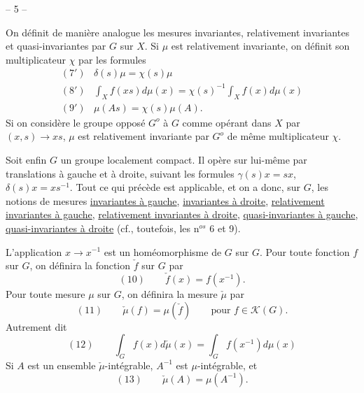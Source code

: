 \begin{center}-- 5 --\end{center}
On définit de manière analogue les mesures invariantes, relativement invariantes
et quasi-invariantes par $G$ sur $X$. Si $\mu$ est relativement invariante,
on définit son multiplicateur $\chi$ par les formules
\[
\begin{array}{ll}
(7') & \delta(s)\mu=\chi(s)\mu\\
(8') & \displaystyle\int_X f(xs)d\mu(x)=\chi(s)^{-1}\int_X f(x)d\mu(x)\\
(9') & \mu(As)=\chi(s)\mu(A).
\end{array}
\]
Si on considère le groupe opposé $G^o$ à $G$ comme opérant dans $X$ par
$(x,s)\longrightarrow xs$, $\mu$ est relativement invariante par $G^o$
de même multiplicateur $\chi$.

Soit enfin $G$ un groupe localement compact. Il opère sur lui-même par translations
à gauche et à droite, suivant les formules $\gamma(s)x=sx$, $\delta(s)x=xs^{-1}$.
Tout ce qui précède est applicable, et on a donc, sur $G$, les notions de mesures
\uline{invariantes à gauche}, \uline{invariantes à droite},
\uline{relativement invariantes à gauche}, \uline{relativement invariantes à droite},
\uline{quasi-invariantes à gauche}, \uline{quasi-invariantes à droite}
(cf., toutefois, les n$^{os}$ 6 et 9).

L’application $x\longrightarrow x^{-1}$ est un homéomorphisme de $G$ sur $G$.
Pour toute fonction $f$ sur $G$, on définira la fonction $\check f$ sur $G$ par
\[
(10)\qquad\check f(x)=f(x^{-1}).
\]
Pour toute mesure $\mu$ sur $G$, on définira la mesure $\check\mu$ par
\[
(11)\qquad\check\mu(f)=\mu(\check f)\qquad\text{pour }f\in\mathcal K(G).
\]
Autrement dit
\[
(12)\qquad\int_G f(x)d\check\mu(x)=\int_G f(x^{-1})d\mu(x)
\]
Si $A$ est un ensemble $\check\mu$-intégrable, $A^{-1}$ est $\mu$-intégrable, et
\[
(13)\qquad\check\mu(A)=\mu(A^{-1}).
\]
